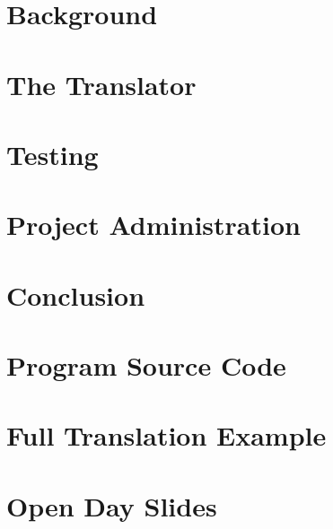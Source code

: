 \documentclass[a4paper,12pt,twoside,openright]{report}
\begin{document}
%
%



\tableofcontents


%
%

\chapter{Background}


\chapter{The Translator}


\chapter{Testing}


\chapter{Project Administration}


\chapter{Conclusion}



%
%

\appendix

\chapter{Program Source Code}


\chapter{Full Translation Example}


\chapter{Open Day Slides}



%
%


\end{document}

